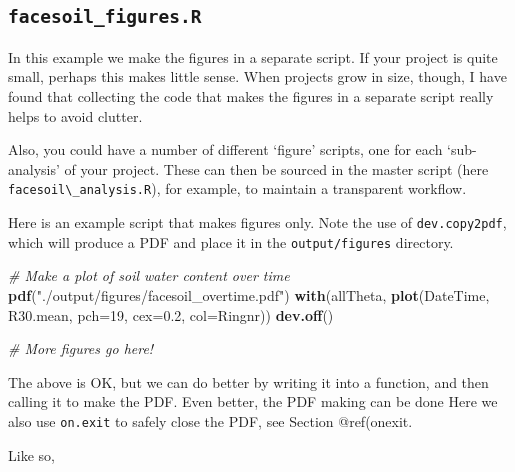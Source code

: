 \documentclass[]{book}
\newenvironment{Shaded}{\begin{snugshade}}{\end{snugshade}}
\newcommand{\CommentTok}[1]{\textcolor[rgb]{0.56,0.35,0.01}{\textit{#1}}}
\newcommand{\DataTypeTok}[1]{\textcolor[rgb]{0.13,0.29,0.53}{#1}}
\newcommand{\DecValTok}[1]{\textcolor[rgb]{0.00,0.00,0.81}{#1}}
\newcommand{\FloatTok}[1]{\textcolor[rgb]{0.00,0.00,0.81}{#1}}
\newcommand{\KeywordTok}[1]{\textcolor[rgb]{0.13,0.29,0.53}{\textbf{#1}}}
\newcommand{\NormalTok}[1]{#1}
\newcommand{\StringTok}[1]{\textcolor[rgb]{0.31,0.60,0.02}{#1}}
\begin{document}
\hypertarget{facesoil_figures.r}{%
\subsection{\texorpdfstring{\texttt{facesoil\_figures.R}}{facesoil\_figures.R}}\label{facesoil_figures.r}}

In this example we make the figures in a separate script. If your project is quite small, perhaps this makes little sense. When projects grow in size, though, I have found that collecting the code that makes the figures in a separate script really helps to avoid clutter.

Also, you could have a number of different `figure' scripts, one for each `sub-analysis' of your project. These can then be sourced in the master script (here \texttt{facesoil\textbackslash{}\_analysis.R}), for example, to maintain a transparent workflow.

Here is an example script that makes figures only. Note the use of \texttt{dev.copy2pdf}, which will produce a PDF and place it in the \texttt{output/figures} directory.

\begin{Shaded}
\begin{Highlighting}[]
\CommentTok{# Make a plot of soil water content over time}
\KeywordTok{pdf}\NormalTok{(}\StringTok{"./output/figures/facesoil_overtime.pdf"}\NormalTok{)}
\KeywordTok{with}\NormalTok{(allTheta, }\KeywordTok{plot}\NormalTok{(DateTime, R30.mean, }\DataTypeTok{pch=}\DecValTok{19}\NormalTok{, }\DataTypeTok{cex=}\FloatTok{0.2}\NormalTok{,}
                    \DataTypeTok{col=}\NormalTok{Ringnr))}
\KeywordTok{dev.off}\NormalTok{()}

\CommentTok{# More figures go here!}
\end{Highlighting}
\end{Shaded}

The above is OK, but we can do better by writing it into a function, and then calling it to make the PDF. Even better, the PDF making can be done Here we also use \texttt{on.exit} to safely close the PDF, see Section @ref(onexit.

Like so,
\end{document}
